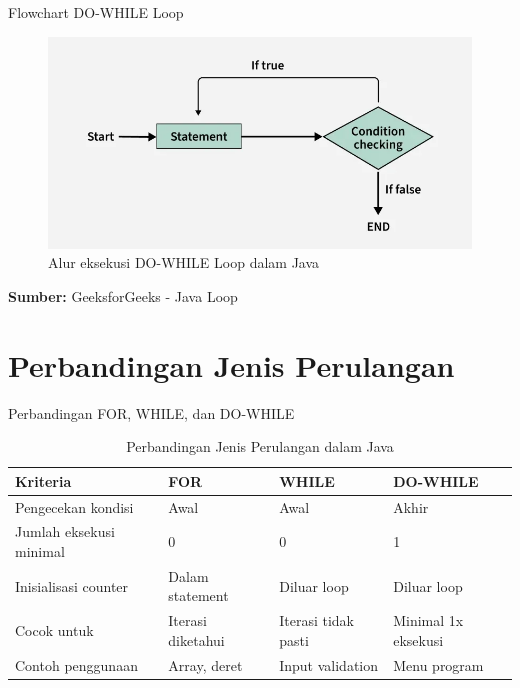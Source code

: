 \documentclass{beamer}
\begin{document}
\begin{frame}{Flowchart DO-WHILE Loop}
  \begin{figure}
      \centering
      \includegraphics[width=0.85\linewidth]{Perulangan/do-while-flowchart.png}
      \caption{Alur eksekusi DO-WHILE Loop dalam Java}
      \label{fig:placeholder}
  \end{figure}
  \textbf{Sumber: }GeeksforGeeks - Java Loop
\end{frame}

\section{Perbandingan Jenis Perulangan}
\begin{frame}{Perbandingan FOR, WHILE, dan DO-WHILE}
  \begin{table}
    \footnotesize
    \begin{tabular}{p{}|p{}|p{}|p{}}
    \textbf{Kriteria} & \textbf{FOR} & \textbf{WHILE} & \textbf{DO-WHILE} \\
    \hline
    \rowcolor{lightgray}
    Pengecekan kondisi & Awal & Awal & Akhir \\
    \rowcolor{white}
    Jumlah eksekusi minimal & 0 & 0 & 1 \\
    \rowcolor{lightgray}
    Inisialisasi counter & Dalam statement & Diluar loop & Diluar loop \\
    \rowcolor{white}
    Cocok untuk & Iterasi diketahui & Iterasi tidak pasti & Minimal 1x eksekusi \\
    \rowcolor{lightgray}
    Contoh penggunaan & Array, deret & Input validation & Menu program \\
    \end{tabular}
    \caption{Perbandingan Jenis Perulangan dalam Java}
  \end{table}
\end{frame}
\end{document}
